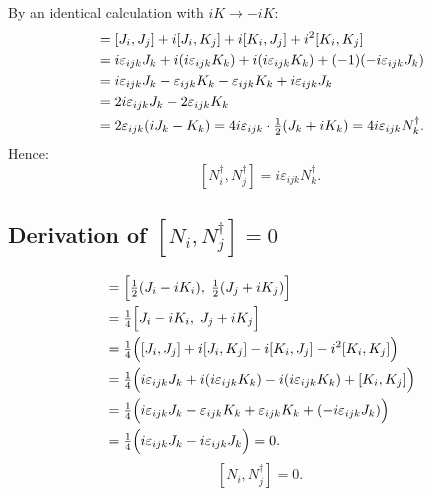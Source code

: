 \documentclass[12pt]{article}
\theoremstyle{remark}
\begin{document}
By an identical calculation with $iK \to -iK$:
\begin{align}
  [J_i + iK_i,\; J_j + iK_j]
  &= [J_i, J_j]
     + i[J_i, K_j]
     + i[K_i, J_j]
     + i^2[K_i, K_j]
  \notag\\
  &= i\varepsilon_{ijk}J_k
     + i(i\varepsilon_{ijk}K_k)
     + i(i\varepsilon_{ijk}K_k)
     + (-1)(-i\varepsilon_{ijk}J_k)
  \notag\\
  &= i\varepsilon_{ijk}J_k
     - \varepsilon_{ijk}K_k
     - \varepsilon_{ijk}K_k
     + i\varepsilon_{ijk}J_k
  \notag\\
  &= 2i\varepsilon_{ijk}J_k - 2\varepsilon_{ijk}K_k
  \notag\\
  &= 2\varepsilon_{ijk}(iJ_k - K_k)
   = 4i\varepsilon_{ijk}\cdot\tfrac{1}{2}(J_k + iK_k)
   = 4i\varepsilon_{ijk}N_k^\dagger.
\end{align}
Hence:
\begin{equation}
  \boxed{[N_i^\dagger, N_j^\dagger] = i\varepsilon_{ijk}N_k^\dagger.}
\end{equation}

\subsection{Derivation of
  \texorpdfstring{$[N_i,N_j^\dagger]=0$}{[N,N†]=0}}

\begin{align}
  [N_i, N_j^\dagger]
  &= \Bigl[\tfrac{1}{2}(J_i - iK_i),\; \tfrac{1}{2}(J_j + iK_j)\Bigr]
  \notag\\
  &= \tfrac{1}{4}\Bigl[J_i - iK_i,\; J_j + iK_j\Bigr]
  \notag\\
  &= \tfrac{1}{4}\Bigl(
       [J_i, J_j] + i[J_i, K_j] - i[K_i, J_j] - i^2[K_i, K_j]
     \Bigr)
  \notag\\
  &= \tfrac{1}{4}\Bigl(
       i\varepsilon_{ijk}J_k
       + i(i\varepsilon_{ijk}K_k)
       - i(i\varepsilon_{ijk}K_k)
       + [K_i, K_j]
     \Bigr)
  \notag\\
  &= \tfrac{1}{4}\Bigl(
       i\varepsilon_{ijk}J_k
       - \varepsilon_{ijk}K_k
       + \varepsilon_{ijk}K_k
       + (-i\varepsilon_{ijk}J_k)
     \Bigr)
  \notag\\
  &= \tfrac{1}{4}\Bigl(i\varepsilon_{ijk}J_k - i\varepsilon_{ijk}J_k\Bigr) = 0.
\end{align}
\begin{equation}
  \boxed{[N_i, N_j^\dagger] = 0.}
\end{equation}
\end{document}
